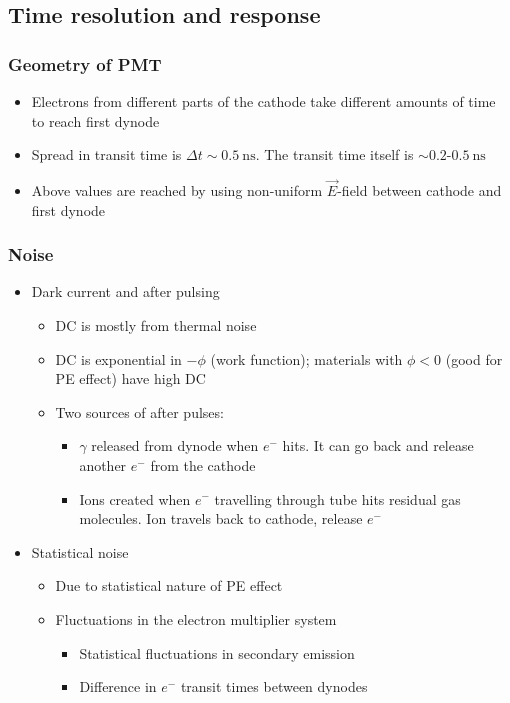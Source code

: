 \documentclass[11pt]{article}
\newcommand{\E}{\ensuremath{\vec{E}}}
\newcommand{\ns}{\text{ns}}
\newcommand{\el}{\ensuremath{e^{-}}\xspace}
\begin{document}
\subsection{Time resolution and response}
\subsubsection{Geometry of PMT}
\begin{itemize}
  \item Electrons from different parts of the cathode take different amounts of time to reach first dynode
  \item Spread in transit time is $\Delta t\sim 0.5~\ns$. The transit time itself is $\sim 0.2$-$0.5~\ns$
  \item Above values are reached by using non-uniform \E-field between cathode and first dynode
\end{itemize}
\subsubsection{Noise}
\begin{itemize}
  \item Dark current and after pulsing
  \begin{itemize}
    \item DC is mostly from thermal noise
    \item DC is exponential in $-\phi$ (work function); materials with $\phi<0$ (good for PE effect) have high DC
    \item Two sources of after pulses:
    \begin{itemize}
      \item $\gamma$ released from dynode when \el hits. It can go back and release another \el from the cathode
      \item Ions created when \el travelling through tube hits residual gas molecules. Ion travels back to cathode, release \el
    \end{itemize}
  \end{itemize}
  \item Statistical noise
  \begin{itemize}
    \item Due to statistical nature of PE effect
    \item Fluctuations in the electron multiplier system
    \begin{itemize}
      \item Statistical fluctuations in secondary emission
      \item Difference in \el transit times between dynodes
    \end{itemize}
  \end{itemize}
\end{itemize}
\end{document}

